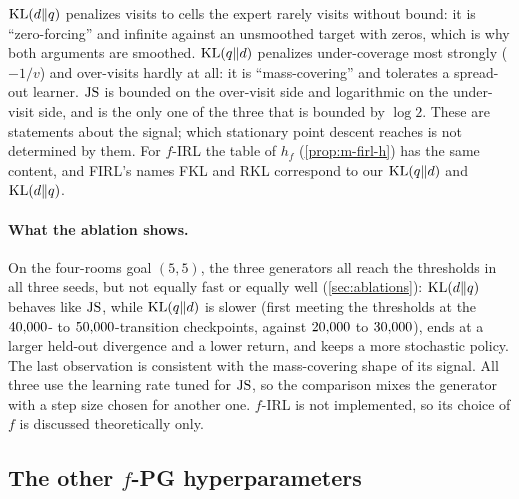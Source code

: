 $\KL(d\Vert q)$ penalizes visits to cells the expert rarely visits without bound: it is ``zero-forcing'' and infinite against an unsmoothed target with zeros, which is why both arguments are smoothed.
$\KL(q\Vert d)$ penalizes under-coverage most strongly ($-1/v$) and over-visits hardly at all: it is ``mass-covering'' and tolerates a spread-out learner.
$\JS$ is bounded on the over-visit side and logarithmic on the under-visit side, and is the only one of the three that is bounded by $\log2$.
These are statements about the signal; which stationary point descent reaches is not determined by them.
For $f$-IRL the table of $h_f$ (\cref{prop:m-firl-h}) has the same content, and FIRL's names FKL and RKL correspond to our $\KL(q\Vert d)$ and $\KL(d\Vert q)$.

\paragraph{What the ablation shows.}
On the four-rooms goal $(5,5)$, the three generators all reach the thresholds in all three seeds, but not equally fast or equally well (\cref{sec:ablations}): $\KL(d\Vert q)$ behaves like $\JS$, while $\KL(q\Vert d)$ is slower (first meeting the thresholds at the $\vn{s09.klqd.first.lo}{40{,}000}$- to $\vn{s09.klqd.first.hi}{50{,}000}$-transition checkpoints, against $\vn{s09.js_kldq.first.lo}{20{,}000}$ to $\vn{s09.js_kldq.first.hi}{30{,}000}$), ends at a larger held-out divergence and a lower return, and keeps a more stochastic policy. The last observation is consistent with the mass-covering shape of its signal. All three use the learning rate tuned for $\JS$, so the comparison mixes the generator with a step size chosen for another one. $f$-IRL is not implemented, so its choice of $f$ is discussed theoretically only.

\subsection{The other \texorpdfstring{$f$}{f}-PG hyperparameters}

